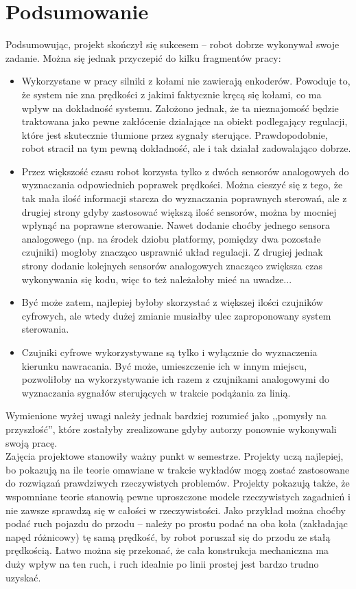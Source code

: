 \documentclass[11pt]{article}
\begin{document}
\newpage

\section{Podsumowanie}

Podsumowując, projekt skończył się sukcesem -- robot dobrze wykonywał swoje zadanie. Można się jednak przyczepić do kilku fragmentów pracy:
\begin{itemize}
\item Wykorzystane w pracy silniki z kołami nie zawierają enkoderów. Powoduje to, że system nie zna prędkości z jakimi faktycznie kręcą się kołami, co ma wpływ na dokładność systemu. Założono jednak, że ta nieznajomość będzie traktowana jako pewne zakłócenie działające na obiekt podlegający regulacji, które jest skutecznie tłumione przez sygnały sterujące. Prawdopodobnie, robot stracił na tym pewną dokładność, ale i tak działał zadowalająco dobrze.
\item Przez większość czasu robot korzysta tylko z dwóch sensorów analogowych do wyznaczania odpowiednich poprawek prędkości. Można cieszyć się z tego, że tak mała ilość informacji starcza do wyznaczania poprawnych sterowań, ale z drugiej strony gdyby zastosować większą ilość sensorów, można by mocniej wpłynąć na poprawne sterowanie. Nawet dodanie choćby jednego sensora analogowego (np. na środek dziobu platformy, pomiędzy dwa pozostałe czujniki) mogłoby znacząco usprawnić układ regulacji. Z drugiej jednak strony dodanie kolejnych sensorów analogowych znacząco zwiększa czas wykonywania się kodu, więc to też należałoby mieć na uwadze...
\item Być może zatem, najlepiej byłoby skorzystać z większej ilości czujników cyfrowych, ale wtedy dużej zmianie musiałby ulec zaproponowany system sterowania.
\item Czujniki cyfrowe wykorzystywane są tylko i wyłącznie do wyznaczenia kierunku nawracania. Być może, umieszczenie ich w innym miejscu, pozwoliłoby na wykorzystywanie ich razem z czujnikami analogowymi do wyznaczania sygnałów sterujących w trakcie podążania za linią.
\end{itemize}

Wymienione wyżej uwagi należy jednak bardziej rozumieć jako ,,pomysły na przyszłość'', które zostałyby zrealizowane gdyby autorzy ponownie wykonywali swoją pracę.\\


Zajęcia projektowe stanowiły ważny punkt w semestrze. Projekty uczą najlepiej, bo pokazują na ile teorie omawiane w trakcie wykładów mogą zostać zastosowane do rozwiązań prawdziwych rzeczywistych problemów. Projekty pokazują także, że wspomniane teorie stanowią pewne uproszczone modele rzeczywistych zagadnień i nie zawsze sprawdzą się w całości w rzeczywistości. Jako przykład można choćby podać ruch pojazdu do przodu -- należy po prostu podać na oba koła (zakładając napęd różnicowy) tę samą prędkość, by robot poruszał się do przodu ze stałą prędkością. Łatwo można się przekonać, że cała konstrukcja mechaniczna ma duży wpływ na ten ruch, i ruch idealnie po linii prostej jest bardzo trudno uzyskać.
\end{document}
